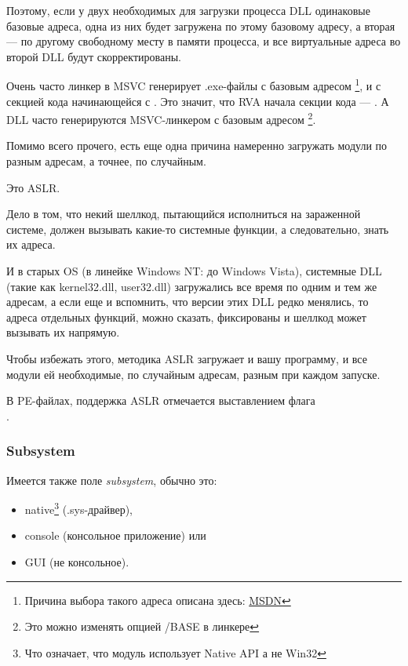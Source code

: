 Поэтому, если у двух необходимых для загрузки процесса DLL одинаковые базовые адреса,
одна из них будет загружена по этому базовому адресу, 
а вторая --- по другому свободному месту в памяти процесса, и все виртуальные адреса во второй DLL будут скорректированы.

\par Очень часто линкер в \ac{MSVC} генерирует .exe-файлы с базовым адресом  \footnote{Причина выбора такого адреса описана здесь: \href{http://go.yurichev.com/17041}{MSDN}},
и с секцией кода начинающейся с .
Это значит, что \ac{RVA} начала секции кода --- .
А \ac{DLL} часто генерируются MSVC-линкером с базовым адресом \footnote{Это можно изменять опцией /BASE в линкере}.

Помимо всего прочего, есть еще одна причина намеренно загружать модули по разным адресам, а точнее, по случайным.

Это \ac{ASLR}.

Дело в том, что некий шеллкод, пытающийся исполниться на зараженной системе, должен вызывать какие-то системные функции, а следовательно, знать их адреса.

И в старых \ac{OS} (в линейке \gls{Windows NT}: до Windows Vista),
системные DLL (такие как kernel32.dll, user32.dll) загружались все время
по одним и тем же адресам, 
а если еще и вспомнить, что версии этих DLL редко менялись, то адреса отдельных
функций, можно сказать, фиксированы и шеллкод может вызывать их напрямую.

Чтобы избежать этого, методика \ac{ASLR}
загружает и вашу программу, и все модули ей необходимые, по случайным адресам, разным при каждом запуске.

В PE-файлах, поддержка \ac{ASLR} отмечается выставлением флага \\
 .

\subsubsection{Subsystem}

Имеется также поле \emph{subsystem}, обычно это:

\begin{itemize}
\item native\footnote{Что означает, что модуль использует Native API а не Win32} (.sys-драйвер), 

\item console (консольное приложение) или

\item \ac{GUI} (не консольное).
\end{itemize}


